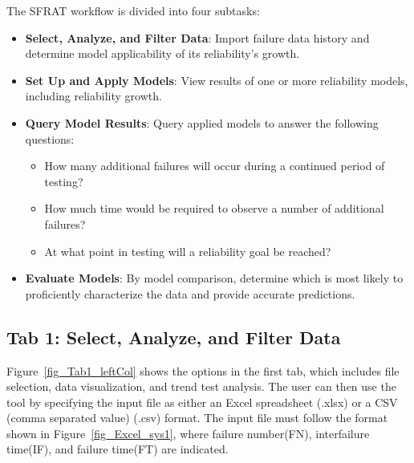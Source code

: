 \documentclass[conference]{IEEEtran}
\begin{document}
The SFRAT workflow is divided into four subtasks:
\begin{itemize}
\item{\textbf{Select, Analyze, and Filter Data}: Import failure data history and determine model applicability of its reliability's growth.}
\item{\textbf{Set Up and Apply Models}: View results of one or more reliability models, including reliability growth.}
\item{\textbf{Query Model Results}: Query applied models to answer the following questions:
\begin{itemize}
\item{How many additional failures will occur during a continued period of testing?}
\item{How much time would be required to observe a number of additional failures?}
\item{At what point in testing will a reliability goal be reached?}
\end{itemize}}
\item{\textbf{Evaluate Models}: By model comparison, determine which is most likely to proficiently characterize the data and provide accurate predictions.}
\end{itemize}


\subsection{Tab 1: Select, Analyze, and Filter Data}\label{tab1}
Figure~\ref{fig_Tab1_leftCol} shows the options in the first tab, which includes file selection, data visualization, and trend test analysis. The user can then use the tool by specifying the input file as either an Excel spreadsheet (.xlsx) or a CSV (comma separated value) (.csv) format. The input file must follow the format shown in Figure~\ref{fig_Excel_sys1}, where failure number(FN), interfailure time(IF), and failure time(FT) are indicated.
\end{document}
